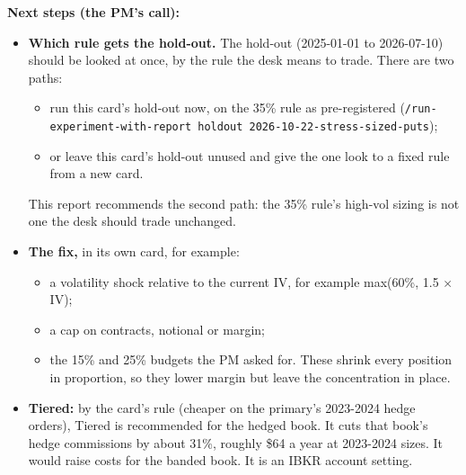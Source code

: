\documentclass{article}
\begin{document}
\textbf{Next steps (the PM's call):}

\begin{itemize}

\item \textbf{Which rule gets the hold-out.} The hold-out (2025-01-01 to 2026-07-10) should be looked at once, by the rule the desk means to trade. There are two paths:

\begin{itemize}

\item run this card's hold-out now, on the 35\% rule as pre-registered (\texttt{/\allowbreak{}run-\allowbreak{}experiment-\allowbreak{}with-\allowbreak{}report holdout 2026-\allowbreak{}10-\allowbreak{}22-\allowbreak{}stress-\allowbreak{}sized-\allowbreak{}puts});

\item or leave this card's hold-out unused and give the one look to a fixed rule from a new card.

\end{itemize}

This report recommends the second path: the 35\% rule's high-vol sizing is not one the desk should trade unchanged.

\item \textbf{The fix,} in its own card, for example:

\begin{itemize}

\item a volatility shock relative to the current IV, for example max(60\%, 1.5 \ensuremath{\times} IV);

\item a cap on contracts, notional or margin;

\item the 15\% and 25\% budgets the PM asked for. These shrink every position in proportion, so they lower margin but leave the concentration in place.

\end{itemize}

\item \textbf{Tiered:} by the card's rule (cheaper on the primary's 2023-2024 hedge orders), Tiered is recommended for the hedged book. It cuts that book's hedge commissions by about 31\%, roughly \$64 a year at 2023-2024 sizes. It would raise costs for the banded book. It is an IBKR account setting.

\end{itemize}
\end{document}
